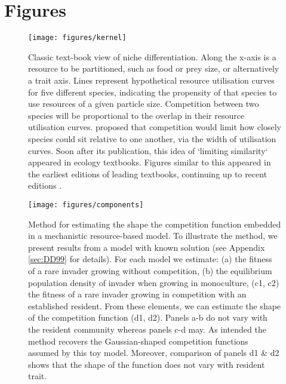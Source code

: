 \documentclass[a4paper,11pt]{article}
\begin{document}
\clearpage

\section{Figures}

\begin{figure}[h]
  \centering
  \texttt{[image: figures/kernel]}
  \caption{Classic text-book view of niche differentiation.  Along the
    x-axis is a resource to be partitioned, such as food or prey size,
    or alternatively a trait axis.  Lines represent hypothetical
    resource utilisation curves for five different species, indicating
    the propensity of that species to use resources of a given particle size.
    Competition between two species will be proportional to
    the overlap in their resource utilisation
    curves. \citet{MacArthur-1967} proposed that competition would
    limit how closely species could sit relative to one another, via
    the width of utilisation curves. Soon after its publication,
    this idea of `limiting similarity` appeared in ecology textbooks. Figures similar to this appeared in the earliest
 editions of leading textbooks, continuing up to recent editions
    \citep{Begon-1986, Begon-2006, Krebs-1978, Krebs-2013,
      Ricklefs-1973, Ricklefs-1999}.}
  \label{fig:competition-kernels}
\end{figure}

\begin{figure}[h]
 \centering
 \texttt{[image: figures/components]}
 \caption{Method for estimating the shape the competition function embedded
  in a mechanistic resource-based model. To illustrate the method, we present
  results from a model with known solution \citep{Dieckmann-1999} (see Appendix
  \ref{sec:DD99} for details). For each
  model we estimate: (a) the fitness of a rare invader growing without competition,
  (b) the equilibrium population density of invader when growing in monoculture,
  (c1, c2) the fitness of a rare invader growing in competition with an established
  resident. From these elements, we can estimate the shape of the competition
  function (d1, d2). Panels a-b do not vary with the resident community whereas
  panels c-d may.  As intended the method recovers the Gaussian-shaped competition
  functions assumed by this toy model. Moreover, comparison of panels d1 \& d2
  shows that the shape of the function does not vary with resident trait.}
  \label{fig:components}
\end{figure}
\end{document}
